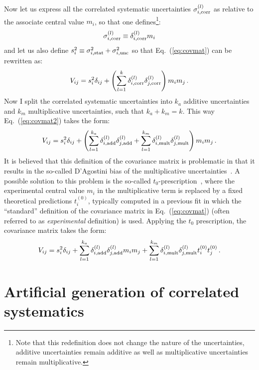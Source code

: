 \documentclass[10pt,a4paper]{article}
\begin{document}
Now let us express all the correlated systematic uncertainties
$\sigma_{i,\rm corr}^{(l)}$ as relative to the associate central value
$m_i$, so that one defines\footnote{Note that this redefinition does
  not change the nature of the uncertainties, additive uncertainties
  remain additive as well as multiplicative uncertainties remain
  multiplicative.}:
\begin{equation}
\sigma_{i,\rm corr}^{(l)}\equiv  \delta_{i,\rm corr}^{(l)} m_i
\end{equation}
and let us also define
$s_i^2\equiv \sigma_{i,\rm stat}^2 +\sigma_{i,\rm unc}^2$ so that
Eq.~(\ref{eq:covmat}) can be rewritten as:
\begin{equation}\label{eq:covmat2}
  V_{ij}=s_i^2\delta_{ij} + \left(\sum_{l=1}^{k}\delta_{i,\rm
    corr}^{(l)}\delta_{j,\rm
    corr}^{(l)}\right)m_im_j\,.
\end{equation}
Now I split the correlated systematic uncertainties into $k_a$
additive uncertainties and $k_m$ multiplicative uncertainties, such
that $k_a+k_m=k$. This way Eq.~(\ref{eq:covmat2}) takes the form:
\begin{equation}\label{eq:covmat3}
  V_{ij}=s_i^2\delta_{ij} + \left(\sum_{l=1}^{k_a}\delta_{i,\rm
    add}^{(l)}\delta_{j,\rm
    add}^{(l)}+\sum_{l=1}^{k_m}\delta_{i,\rm
    mult}^{(l)}\delta_{j,\rm
    mult}^{(l)}\right)m_im_j\,.
\end{equation}
It is believed that this definition of the covariance matrix is
problematic in that it results in the so-called D'Agostini bias of the
multiplicative uncertainties~\cite{DAgostini:1993arp}. A possible
solution to this problem is the so-called
$t_0$-prescription~\cite{Ball:2009qv}, where the experimental central
value $m_i$ in the multiplicative term is replaced by a fixed
theoretical predictions $t_i^{(0)}$, typically computed in a previous
fit in which the ``standard'' definition of the covariance matrix in
Eq.~(\ref{eq:covmat}) (often referred to as \textit{experimental}
definition) is used. Applying the $t_0$ prescription, the covariance
matrix takes the form:
\begin{equation}\label{eq:covmat4}
  V_{ij}=s_i^2\delta_{ij} + \sum_{l=1}^{k_a}\delta_{i,\rm
    add}^{(l)}\delta_{j,\rm
    add}^{(l)}m_im_j+\sum_{l=1}^{k_m}\delta_{i,\rm
    mult}^{(l)}\delta_{j,\rm
    mult}^{(l)}t_i^{(0)}t_j^{(0)}\,.
\end{equation}

\section{Artificial generation of correlated systematics}
\end{document}
